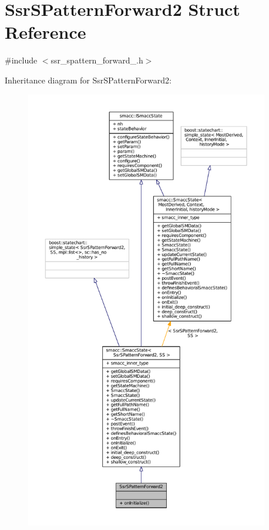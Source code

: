 \hypertarget{structSsrSPatternForward2}{}\section{Ssr\+S\+Pattern\+Forward2 Struct Reference}
\label{structSsrSPatternForward2}


{\ttfamily \#include $<$ssr\+\_\+spattern\+\_\+forward\+\_.\+h$>$}



Inheritance diagram for Ssr\+S\+Pattern\+Forward2\+:
\nopagebreak
\begin{figure}[H]
\begin{center}
\leavevmode
\includegraphics[height=550pt]{structSsrSPatternForward2__inherit__graph}
\end{center}
\end{figure}


